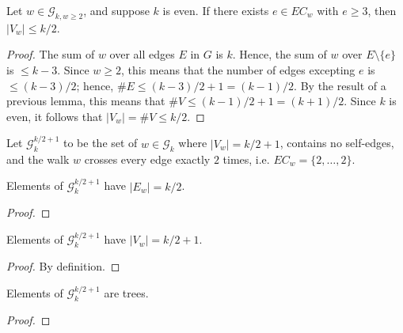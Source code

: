 \begin{proposition}%
  \label{prop:g_bound_large_w}
  Let $w \in\mathcal{G}_{k,w \geq 2}$, and suppose $k$ is even. If there exists $e\in EC_w$
  with $e \ge 3$, then $|V_w|\le k/2$.
\end{proposition}

\begin{proof}
  The sum of $w$ over all edges $E$ in $G$ is $k$.  Hence, the sum of $w$ over $E\setminus\{e\}$ is $\le k-3$.
  Since $w\ge 2$, this means that the number of edges excepting $e$ is $\le (k-3)/2$; hence, $\#E \le (k-3)/2+1 = (k-1)/2$.
  By the result of a previous lemma, this means that $\#V \le (k-1)/2+1 = (k+1)/2$.
  Since $k$ is even, it follows that $|V_w|=\#V \le k/2$.
\end{proof}


\begin{definition}
  \label{def:special_set_g}
  Let $\mathcal{G}^{k/2+1}_k$ to be the set of $w\in\mathcal{G}_k$ where $|V_w|=k/2+1$,
  contains no self-edges, and the walk $w$ crosses every edge exactly $2$ times, i.e.
  $EC_w =\{2, \dots, 2\}$.
\end{definition}


\begin{lemma}
  \label{lem:special_g_edge_count}
  Elements of $\mathcal{G}_k^{k/2+1}$ have $|E_w| = k/2$.
\end{lemma}

\begin{proof}
\end{proof}


\begin{lemma}
  \label{lem:special_g_vertex_count}
  Elements of $\mathcal{G}_k^{k/2+1}$ have $|V_w| = k/2 + 1$.
\end{lemma}

\begin{proof}
  By definition.
\end{proof}


\begin{lemma}
  \label{lem:special_g_tree}
  Elements of $\mathcal{G}_k^{k/2+1}$ are trees.
\end{lemma}

\begin{proof}
\end{proof}


